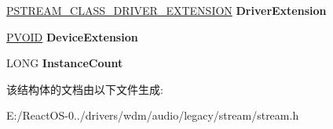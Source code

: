 \begin{DoxyCompactItemize}
\hyperlink{struct_s_t_r_e_a_m___c_l_a_s_s___d_r_i_v_e_r___e_x_t_e_n_s_i_o_n}{P\+S\+T\+R\+E\+A\+M\+\_\+\+C\+L\+A\+S\+S\+\_\+\+D\+R\+I\+V\+E\+R\+\_\+\+E\+X\+T\+E\+N\+S\+I\+ON} {\bfseries Driver\+Extension}
\item 
\mbox{\label{struct_s_t_r_e_a_m___d_e_v_i_c_e___e_x_t_e_n_s_i_o_n_acc2dc5862939f8989f99e8a953e5cf6e}} 
\hyperlink{interfacevoid}{P\+V\+O\+ID} {\bfseries Device\+Extension}
\item 
\mbox{\label{struct_s_t_r_e_a_m___d_e_v_i_c_e___e_x_t_e_n_s_i_o_n_af900072b4d50c1e1b9b485926ef3ae9e}} 
L\+O\+NG {\bfseries Instance\+Count}
\end{DoxyCompactItemize}


该结构体的文档由以下文件生成\+:\begin{DoxyCompactItemize}
\item 
E\+:/\+React\+O\+S-\/0../drivers/wdm/audio/legacy/stream/stream.\+h\end{DoxyCompactItemize}

